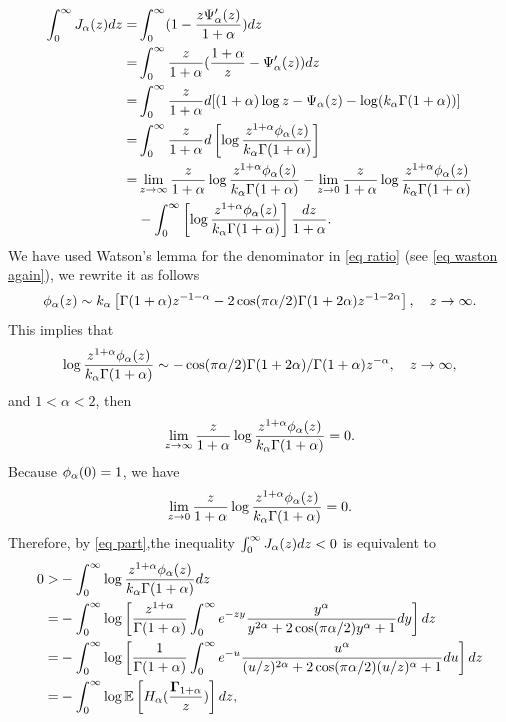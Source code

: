 \documentclass[12pt]{amsart}
\begin{document}
\begin{align}
    \int_0^\infty J_\alpha (z)dz = &  \int_0^\infty (1 - \frac{z\Psi'_\alpha (z)}{1 + \alpha}) dz \\
    = &  \int_0^\infty \frac{z}{1 + \alpha}(\frac{1 + \alpha}{z} - \Psi'_\alpha (z)) dz   \\
    = &  \int_0^\infty \frac{z}{1 + \alpha} d[(1 + \alpha)\log z - \Psi_\alpha (z) - \log (k_\alpha \Gamma(1+\alpha))]  \\
    = &  \int_0^\infty \frac{z}{1 + \alpha} d \left[\log \frac{z^{1+\alpha} \phi_\alpha(z)}{k_\alpha \Gamma(1+\alpha)} \right]   \\
    = &  \lim_{z\rightarrow \infty}  \frac{z}{1 + \alpha} \log \frac{z^{1+\alpha} \phi_\alpha(z)}{k_\alpha \Gamma(1+\alpha)}  - \lim_{z\rightarrow 0}  \frac{z}{1 + \alpha} \log \frac{z^{1+\alpha} \phi_\alpha(z)}{k_\alpha \Gamma(1+\alpha)}\\
    \label{eq part}
    & - \int_0^\infty  \left[\log \frac{z^{1+\alpha} \phi_\alpha(z)}{k_\alpha \Gamma(1+\alpha)} \right]  \frac{dz}{1 + \alpha}. 
\end{align}
We have used Watson's lemma for the denominator in \eqref{eq ratio} (see \eqref{eq waston again}), we rewrite it as follows
\begin{equation}
    \phi_\alpha (z) \sim k_\alpha \left[ \Gamma(1+\alpha)z^{-1-\alpha } - 2 \cos(\pi \alpha/2) \Gamma(1 + 2\alpha) z^{-1-2\alpha}\right]  , \quad z \rightarrow \infty. 
\end{equation}
This implies that 
\begin{equation}
    \log \frac{z^{1+\alpha} \phi_\alpha(z)}{k_\alpha \Gamma(1+\alpha)} \sim  - \cos(\pi \alpha/2) \Gamma(1 + 2\alpha)/\Gamma(1+\alpha) z^{-\alpha}  , \quad z \rightarrow \infty,
\end{equation}
and $1< \alpha <2$, then
\begin{equation}
     \lim_{z\rightarrow \infty}  \frac{z}{1 + \alpha} \log \frac{z^{1+\alpha} \phi_\alpha(z)}{k_\alpha \Gamma(1+\alpha)} = 0. 
\end{equation}
Because $\phi_\alpha(0 ) = 1$, we have 
\begin{equation}
     \lim_{z\rightarrow 0}  \frac{z}{1 + \alpha} \log \frac{z^{1+\alpha} \phi_\alpha(z)}{k_\alpha \Gamma(1+\alpha)} = 0. 
\end{equation}
Therefore, by \eqref{eq part},the inequality $\int_0^\infty J_\alpha (z)dz < 0$ is equivalent to 
\begin{align}
  0 > & - \int_0^\infty  \log \frac{z^{1+\alpha} \phi_\alpha(z)}{k_\alpha \Gamma(1+\alpha)}dz \\
  = &  - \int_0^\infty \log \left[ \frac{z^{1+\alpha}}{\Gamma(1+\alpha)} \int_0^\infty  e^{-zy}  \frac{ y^\alpha}{  y^{2\alpha} + 2\cos(\pi \alpha/2)y^\alpha + 1}dy \right] dz  \\
    = &  -\int_0^\infty \log \left[ \frac{1}{\Gamma(1+\alpha)} \int_0^\infty  e^{-u}  \frac{ u^\alpha}{  (u/z)^{2\alpha} + 2\cos(\pi \alpha/2)(u/z)^\alpha + 1}du \right] dz \\
    \label{eq bound}
    = & -\int_0^\infty \log \mathbb{E}\left[ H_\alpha(\frac{{\bf \Gamma}_{1+\alpha}}{z})\right] dz, 
\end{align}
\end{document}
